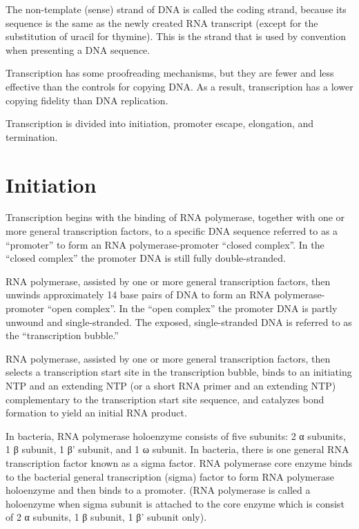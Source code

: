 The non-template (sense) strand of DNA is called the coding strand, because its sequence is the same as the newly created RNA transcript (except for the substitution of uracil for thymine). This is the strand that is used by convention when presenting a DNA sequence.

Transcription has some proofreading mechanisms, but they are fewer and less effective than the controls for copying DNA. As a result, transcription has a lower copying fidelity than DNA replication.

Transcription is divided into initiation, promoter escape, elongation, and termination.

\hypertarget{initiation-2}{%
\section{Initiation}\label{initiation-2}}

Transcription begins with the binding of RNA polymerase, together with one or more general transcription factors, to a specific DNA sequence referred to as a ``promoter'' to form an RNA polymerase-promoter ``closed complex''. In the ``closed complex'' the promoter DNA is still fully double-stranded.

RNA polymerase, assisted by one or more general transcription factors, then unwinds approximately 14 base pairs of DNA to form an RNA polymerase-promoter ``open complex''. In the ``open complex'' the promoter DNA is partly unwound and single-stranded. The exposed, single-stranded DNA is referred to as the ``transcription bubble.''

RNA polymerase, assisted by one or more general transcription factors, then selects a transcription start site in the transcription bubble, binds to an initiating NTP and an extending NTP (or a short RNA primer and an extending NTP) complementary to the transcription start site sequence, and catalyzes bond formation to yield an initial RNA product.

In bacteria, RNA polymerase holoenzyme consists of five subunits: 2 α subunits, 1 β subunit, 1 β' subunit, and 1 ω subunit. In bacteria, there is one general RNA transcription factor known as a sigma factor. RNA polymerase core enzyme binds to the bacterial general transcription (sigma) factor to form RNA polymerase holoenzyme and then binds to a promoter. (RNA polymerase is called a holoenzyme when sigma subunit is attached to the core enzyme which is consist of 2 α subunits, 1 β subunit, 1 β' subunit only).

